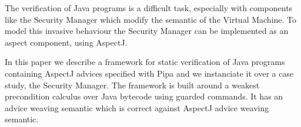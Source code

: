 The verification of Java programs is a difficult task, especially with
components like the Security Manager which modify the semantic of the
Virtual Machine.  To model this invasive behaviour  the Security Manager 
can be implemented as an aspect component, using AspectJ.

In this paper we describe a framework for static verification of Java
programs containing AspectJ advices specified with Pipa and
we instanciate it over a case study, the Security Manager.  The
framework is built around a weakest precondition calculus over Java
bytecode using guarded commands. It has an advice weaving 
semantic which is correct against AspectJ advice weaving semantic.  


